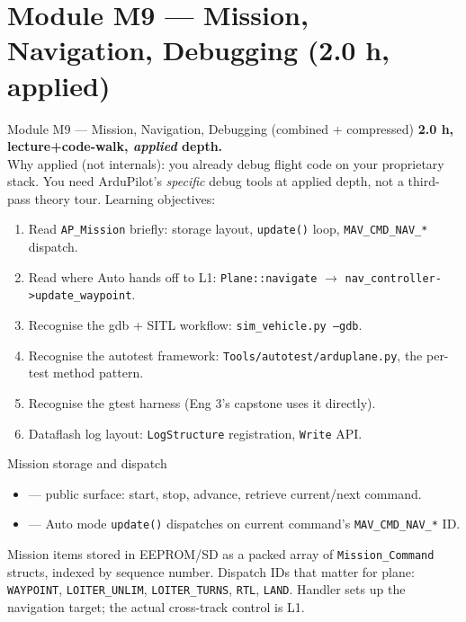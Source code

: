 \documentclass[aspectratio=169,11pt]{beamer}
\begin{document}
\section{Module M9 --- Mission, Navigation, Debugging (2.0 h, applied)}

\begin{frame}{Module M9 --- Mission, Navigation, Debugging (combined + compressed)}
  \textbf{2.0 h, lecture+code-walk, \emph{applied} depth.}\\[1ex]
  Why applied (not internals): you already debug flight code on your proprietary stack. You need ArduPilot's \emph{specific} debug tools at applied depth, not a third-pass theory tour.
  \vfill
  Learning objectives:
  \begin{enumerate}
    \item Read \texttt{AP\_Mission} briefly: storage layout, \texttt{update()} loop, \texttt{MAV\_CMD\_NAV\_*} dispatch.
    \item Read where Auto hands off to L1: \texttt{Plane::navigate} $\rightarrow$ \texttt{nav\_controller->update\_waypoint}.
    \item Recognise the gdb + SITL workflow: \texttt{sim\_vehicle.py --gdb}.
    \item Recognise the autotest framework: \texttt{Tools/autotest/arduplane.py}, the per-test method pattern.
    \item Recognise the gtest harness (Eng 3's capstone uses it directly).
    \item Dataflash log layout: \texttt{LogStructure} registration, \texttt{Write} API.
  \end{enumerate}
\end{frame}

\begin{frame}{Mission storage and dispatch}
  \begin{itemize}
    \item {} --- public surface: start, stop, advance, retrieve current/next command.
    \item {} --- Auto mode \texttt{update()} dispatches on current command's \texttt{MAV\_CMD\_NAV\_*} ID.
  \end{itemize}
  \vfill
  Mission items stored in EEPROM/SD as a packed array of \texttt{Mission\_Command} structs, indexed by sequence number.
  \vfill
  Dispatch IDs that matter for plane: \texttt{WAYPOINT}, \texttt{LOITER\_UNLIM}, \texttt{LOITER\_TURNS}, \texttt{RTL}, \texttt{LAND}.
  \vfill
  Handler sets up the navigation target; the actual cross-track control is L1.
\end{frame}
\end{document}
